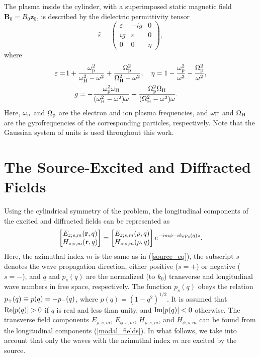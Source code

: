 \documentclass[summary]{URSIGASS2020}
\def\f{\phi}
\def\op{\omega_{\rm p}}
\def\oH{\omega_{\rm H}}
\def\OH{\Omega_{\rm H}}
\def\Op{\Omega_{\rm p}}
\begin{document}
The plasma inside the cylinder, with a superimposed static magnetic field $ \textbf{B}_{0}={B}_{0}\textbf{z}_{0} $, is described by the dielectric permittivity tensor
\begin{equation} \label{eq1}
\hat{\varepsilon}=\!\!
\left(
\begin{array}{ccc}
\varepsilon & -ig & 0 \\
ig & \varepsilon & 0 \\
0 & 0 & \eta
\end{array}
\right),
\end{equation}
where
\begin{align} \label{eq2}
&\varepsilon =\!1+\frac{\op^2}{\oH^2-\omega^2}+\frac{\Op^2}{\OH^2-\omega^2}, \quad
\eta=1-\frac{\op^2}{\omega^2}-\frac{\Op^2}{\omega^2},
 \nonumber \\
&\hspace{10mm}g=-\frac{\op^2\oH}{(\oH^2-\omega^2)\omega}+\frac{\Op^2\OH}{(\OH^2-\omega^2)\omega}.
\end{align}
Here, $ \op $ and $ \Op $ are the electron and ion plasma frequencies, and $ \oH $ and $ \OH $ are the gyrofrequencies of the corresponding particles, respectively.
Note that the Gaussian system of units is used throughout this work.

\section{The Source-Excited and Diffracted Fields}

Using the cylindrical symmetry of the problem, the longitudinal components of the excited and diffracted fields can be represented as 
\begin{equation}\label{modal_fields}
\begin{bmatrix} {E}_{z;s,m}({\bf r},q)\\ {	H}_{z;s,m}({\bf r},q)\end{bmatrix} = \begin{bmatrix} {E}_{z;s,m}(\rho, q)\\ {H}_{z;s,m}(\rho, q)\end{bmatrix}e^{-i m\f - i k_0
	p_{s}(q)z}.
\end{equation}
Here, the azimuthal index $ m $ is the same as in (\ref{source_eq}), the subscript $ s $  denotes the wave propagation direction, either positive ($ s=+ $) or negative ($ s=- $), and $ q $ and $p_{s}(q)$ are the normalized (to $ k_{0} $) transverse and longitudinal wave numbers in free space, respectively.
The function $ p_{s}(q) $ obeys the relation $p_{\rm +}(q)\equiv p(q)= -p_{\rm -}(q)$, where $ p(q)=(1-q^2)^{1/2} $.
It is assumed that $ {\rm Re}[p(q)]>0 $ if $ q $ is real and less than unity, and  $ {\rm Im}[p(q)]<0 $ otherwise.
The transverse field components  $E_{\rho;s,m}$, $E_{\f;s,m}$, $H_{\rho;s,m}$, and $H_{\f;s,m}$ can be found from the longitudinal components (\ref{modal_fields}).
In what follows, we take into account that only the waves with the azimuthal index $ m $ are excited by the source.
\end{document}
